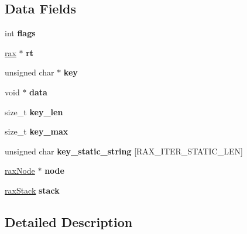 \subsection*{Data Fields}
\begin{DoxyCompactItemize}
\item 
\mbox{\label{structraxIterator_a9296b592aef05d82d78daf6f02853b94}} 
int {\bfseries flags}
\item 
\mbox{\label{structraxIterator_af13f0f675767e94b420819f664e52043}} 
\hyperlink{structrax}{rax} $\ast$ {\bfseries rt}
\item 
\mbox{\label{structraxIterator_a81d635bee561ef346a6dba3a689fbb82}} 
unsigned char $\ast$ {\bfseries key}
\item 
\mbox{\label{structraxIterator_afe84813091d47e5fdf2ebca44429c50b}} 
void $\ast$ {\bfseries data}
\item 
\mbox{\label{structraxIterator_ad5f8b329984805ac1a706304c12ce2d3}} 
size\+\_\+t {\bfseries key\+\_\+len}
\item 
\mbox{\label{structraxIterator_a0f96b3692272ceee8a2685beed85e146}} 
size\+\_\+t {\bfseries key\+\_\+max}
\item 
\mbox{\label{structraxIterator_aaa051abe80ceb44295f450a3f8ca3c62}} 
unsigned char {\bfseries key\+\_\+static\+\_\+string} \mbox{[}R\+A\+X\+\_\+\+I\+T\+E\+R\+\_\+\+S\+T\+A\+T\+I\+C\+\_\+\+L\+EN\mbox{]}
\item 
\mbox{\label{structraxIterator_a0198972a175fc6673af7aef89bc39cc8}} 
\hyperlink{structraxNode}{rax\+Node} $\ast$ {\bfseries node}
\item 
\mbox{\label{structraxIterator_a73ab5e237079aaa64fae170592a5a3fd}} 
\hyperlink{structraxStack}{rax\+Stack} {\bfseries stack}
\end{DoxyCompactItemize}


\subsection{Detailed Description}


